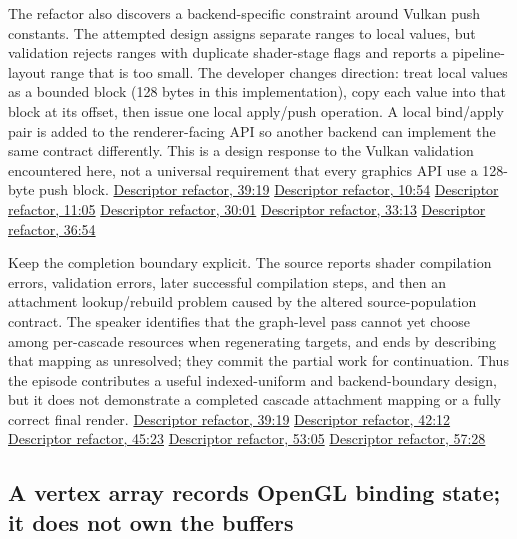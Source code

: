 The refactor also discovers a backend-specific constraint around Vulkan push constants. The attempted design assigns separate ranges to local values, but validation rejects ranges with duplicate shader-stage flags and reports a pipeline-layout range that is too small. The developer changes direction: treat local values as a bounded block (128 bytes in this implementation), copy each value into that block at its offset, then issue one local apply/push operation. A local bind/apply pair is added to the renderer-facing API so another backend can implement the same contract differently. This is a design response to the Vulkan validation encountered here, not a universal requirement that every graphics API use a 128-byte push block. \href{https://www.youtube.com/watch?v=HahgZzF2Dfo&t=2358s}{Descriptor refactor, 39:19} \href{https://www.youtube.com/watch?v=HahgZzF2Dfo&t=653s}{Descriptor refactor, 10:54} \href{https://www.youtube.com/watch?v=HahgZzF2Dfo&t=662s}{Descriptor refactor, 11:05} \href{https://www.youtube.com/watch?v=HahgZzF2Dfo&t=1801s}{Descriptor refactor, 30:01} \href{https://www.youtube.com/watch?v=HahgZzF2Dfo&t=1991s}{Descriptor refactor, 33:13} \href{https://www.youtube.com/watch?v=HahgZzF2Dfo&t=2212s}{Descriptor refactor, 36:54}

Keep the completion boundary explicit. The source reports shader compilation errors, validation errors, later successful compilation steps, and then an attachment lookup/rebuild problem caused by the altered source-population contract. The speaker identifies that the graph-level pass cannot yet choose among per-cascade resources when regenerating targets, and ends by describing that mapping as unresolved; they commit the partial work for continuation. Thus the episode contributes a useful indexed-uniform and backend-boundary design, but it does not demonstrate a completed cascade attachment mapping or a fully correct final render. \href{https://www.youtube.com/watch?v=HahgZzF2Dfo&t=2358s}{Descriptor refactor, 39:19} \href{https://www.youtube.com/watch?v=HahgZzF2Dfo&t=2532s}{Descriptor refactor, 42:12} \href{https://www.youtube.com/watch?v=HahgZzF2Dfo&t=2722s}{Descriptor refactor, 45:23} \href{https://www.youtube.com/watch?v=HahgZzF2Dfo&t=3183s}{Descriptor refactor, 53:05} \href{https://www.youtube.com/watch?v=HahgZzF2Dfo&t=3447s}{Descriptor refactor, 57:28}

\subsection{A vertex array records OpenGL binding state; it does not own the buffers}\label{06-engine-ii-ch026-a-vertex-array-records-opengl-binding-state-it-does-not-own-the-buffers}


